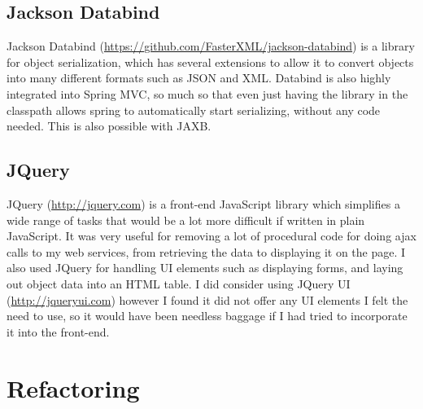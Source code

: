 \documentclass[12pt]{article}
\begin{document}
  \subsection{Jackson Databind}
    \label{jackson-databind}
    Jackson Databind (\url{https://github.com/FasterXML/jackson-databind}) is a library for object serialization, which has several extensions to allow it to convert objects into many different formats such as JSON and XML. Databind is also highly integrated into Spring MVC, so much so that even just having the library in the classpath allows spring to automatically start serializing, without any code needed. This is also possible with JAXB.

  \subsection{JQuery}
    JQuery (\url{http://jquery.com}) is a front-end JavaScript library which simplifies a wide range of tasks that would be a lot more difficult if written in plain JavaScript. It was very useful for removing a lot of procedural code for doing ajax calls to my web services, from retrieving the data to displaying it on the page. I also used JQuery for handling UI elements such as displaying forms, and laying out object data into an HTML table. I did consider using JQuery UI (\url{http://jqueryui.com}) however I found it did not offer any UI elements I felt the need to use, so it would have been needless baggage if I had tried to incorporate it into the front-end.

\section{Refactoring}



\end{document}
